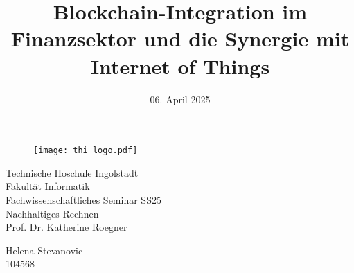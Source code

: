 \documentclass[
    11pt, 			%
]{article}
\title{Blockchain-Integration im Finanzsektor und die Synergie mit Internet of Things}
\date{06. April 2025}
\begin{document}
    \pagestyle{plain}

    \begin{figure}
        \texttt{[image: thi\_logo.pdf]}
    \end{figure}
    \begin{center}
        Technische Hoschule Ingolstadt \\
        \vspace{5pt} 
        Fakultät Informatik \\
        \vspace{5pt} 
        Fachwissenschaftliches Seminar SS25 \\
        \vspace{5pt} 
        Nachhaltiges Rechnen \\
        \vspace{5pt} 
        Prof. Dr. Katherine Roegner
    \end{center}
    \begingroup
    \let\newpage\relax%
    \maketitle
    \endgroup

    \vspace{3cm}
    \begin{center}
        Helena Stevanovic \\
        104568
    \end{center}





    \thispagestyle{empty}

    \newpage
    

    \newpage
    \tableofcontents

    
    
    
    
    

    \listoffigures
    \newpage
    \printbibliography
\end{document}
